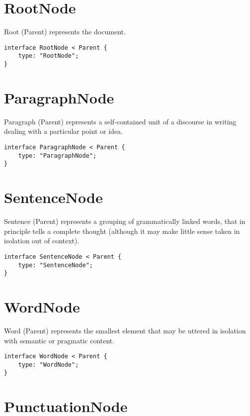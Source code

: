 \section*{RootNode}\label{rootnode}

Root (Parent) represents the document.

\begin{lstlisting}[language=IDL]
interface RootNode < Parent {
    type: "RootNode";
}
\end{lstlisting}

\section*{ParagraphNode}\label{paragraphnode}

Paragraph (Parent) represents a self-contained unit of a discourse in
writing dealing with a particular point or idea.

\begin{lstlisting}[language=IDL]
interface ParagraphNode < Parent {
    type: "ParagraphNode";
}
\end{lstlisting}

\section*{SentenceNode}\label{sentencenode}

Sentence (Parent) represents a grouping of grammatically linked words,
that in principle tells a complete thought (although it may make little
sense taken in isolation out of context).

\begin{lstlisting}[language=IDL]
interface SentenceNode < Parent {
    type: "SentenceNode";
}
\end{lstlisting}

\section*{WordNode}\label{wordnode}

Word (Parent) represents the smallest element that may be uttered in
isolation with semantic or pragmatic content.

\begin{lstlisting}[language=IDL]
interface WordNode < Parent {
    type: "WordNode";
}
\end{lstlisting}

\section*{PunctuationNode}\label{punctuationnode}


